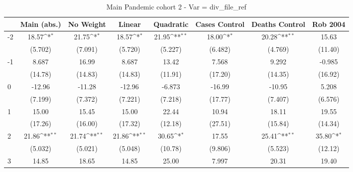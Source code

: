 \documentclass{article}
\begin{document}
{
\def\sym#1{\ifmmode^{#1}\else\(^{#1}\)\fi}
\begin{longtable}{l*{7}{c}}
\caption{Main Pandemic cohort 2 - Var = div\_file\_ref}\\
\hline\hline\endfirsthead\hline\endhead\hline\endfoot\endlastfoot
                &\multicolumn{1}{c}{Main (abs.)}&\multicolumn{1}{c}{No Weight}&\multicolumn{1}{c}{Linear}&\multicolumn{1}{c}{Quadratic}&\multicolumn{1}{c}{Cases Control}&\multicolumn{1}{c}{Deaths Control}&\multicolumn{1}{c}{Rob 2004}\\
\hline
-2              &    18.57\sym{*}  &    21.75\sym{*}  &    18.57\sym{*}  &    21.95\sym{**} &    18.00\sym{*}  &    20.28\sym{**} &    15.63         \\
                &  (5.702)         &  (7.091)         &  (5.720)         &  (5.227)         &  (6.482)         &  (4.769)         &  (11.40)         \\
-1              &    8.687         &    16.99         &    8.687         &    13.42         &    7.568         &    9.292         &   -0.985         \\
                &  (14.78)         &  (14.83)         &  (14.83)         &  (11.91)         &  (17.20)         &  (14.35)         &  (16.92)         \\
0               &   -12.96         &   -11.28         &   -12.96         &   -6.873         &   -16.99         &   -10.95         &    5.208         \\
                &  (7.199)         &  (7.372)         &  (7.221)         &  (7.218)         &  (17.77)         &  (7.407)         &  (6.576)         \\
1               &    15.00         &    15.45         &    15.00         &    22.44         &    10.94         &    18.11         &    19.55         \\
                &  (17.26)         &  (16.00)         &  (17.32)         &  (12.18)         &  (27.51)         &  (15.84)         &  (14.34)         \\
2               &    21.86\sym{**} &    21.74\sym{**} &    21.86\sym{**} &    30.65\sym{*}  &    17.55         &    25.41\sym{**} &    35.80\sym{*}  \\
                &  (5.032)         &  (5.021)         &  (5.048)         &  (10.78)         &  (9.806)         &  (5.523)         &  (12.12)         \\
3               &    14.85         &    18.65         &    14.85         &    25.00         &    7.997         &    20.31         &    19.40         \\

\end{longtable}}
\end{document}
